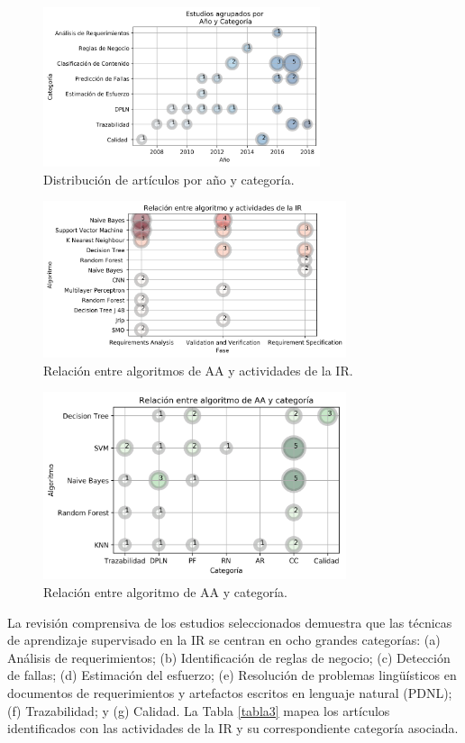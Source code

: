 \documentclass[journal]{IEEEtran}
\begin{document}
\begin{figure}[!t]
\centering
\includegraphics[width=3.2in]{figures/Figure8_Guada.png}
\caption{Distribución de artículos por año y categoría.}
\label{fig:8}
\end{figure}


\begin{figure}[!t]
\centering
\includegraphics[width=3.5in]{figures/figure9_Guada.png}
\caption{Relación entre algoritmos de AA y actividades de la IR.}
\label{fig:9}
\end{figure}

\begin{figure}[!t]
\centering
\includegraphics[width=3.5in]{figures/Figure11_Guadab.png}
\caption{Relación entre algoritmo de AA y categoría.}
\label{fig:10}
\end{figure}


La revisión comprensiva de los estudios seleccionados demuestra que las técnicas de aprendizaje supervisado en la IR se centran en ocho grandes categorías: (a) Análisis de requerimientos; (b) Identificación de reglas de negocio; (c) Detección de fallas; (d) Estimación del esfuerzo; (e) Resolución de problemas lingüísticos en documentos de requerimientos y artefactos escritos en lenguaje natural (PDNL); (f) Trazabilidad; y (g) Calidad. La Tabla \ref{tabla3} mapea los artículos identificados con las actividades de la IR y su correspondiente categoría asociada. 
\end{document}
